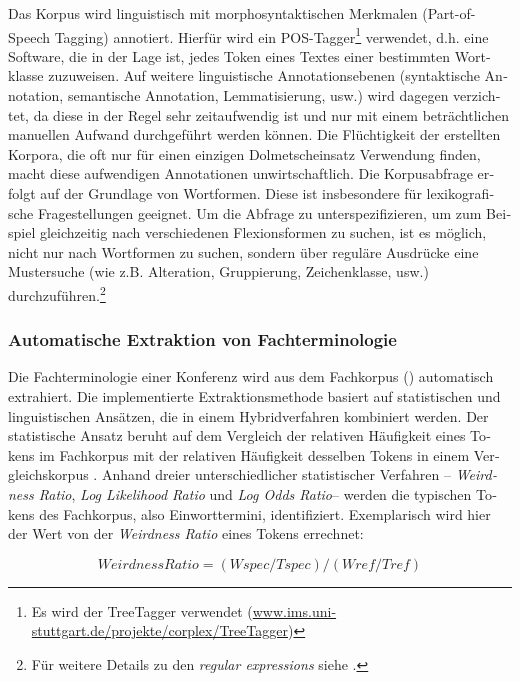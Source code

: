 \documentclass[output=paper]{LSP/langsci}
\begin{document}
\begin{otherlanguage}{ngerman}
Das Korpus wird linguistisch mit morphosyntaktischen Merkmalen (Part-of-Speech Tagging) annotiert.
Hierfür wird ein POS-Tagger\footnote{Es wird der TreeTagger verwendet (\url{www.ims.uni-stuttgart.de/projekte/corplex/TreeTagger})} verwendet, d.h. eine Software, die in der Lage ist, jedes Token eines Textes einer bestimmten Wortklasse zuzuweisen. Auf weitere linguistische Annotationsebenen (syntaktische Annotation, semantische Annotation, Lemmatisierung, usw.) wird dagegen verzichtet, da diese in der Regel sehr zeitaufwendig ist und nur mit einem beträchtlichen manuellen Aufwand durchgeführt werden können. Die Flüchtigkeit der erstellten Korpora, die oft nur für einen einzigen Dolmetscheinsatz Verwendung finden, macht diese aufwendigen Annotationen unwirtschaftlich. Die Korpusabfrage erfolgt auf der Grundlage von Wortformen. Diese ist insbesondere für lexikografische Fragestellungen geeignet. Um die Abfrage zu unterspezifizieren, um zum Beispiel gleichzeitig nach verschiedenen Flexionsformen zu suchen, ist es möglich, nicht nur nach Wortformen zu suchen, sondern über reguläre Ausdrücke eine Mustersuche (wie z.B. Alteration, Gruppierung, Zeichenklasse, usw.) durchzuführen.\footnote{Für weitere Details zu den \textit{regular expressions} siehe \citet{Friedl2006}.}

\subsubsection{Automatische Extraktion von Fachterminologie}\label{sec:fantinuoli:6.1.2}

Die Fachterminologie einer Konferenz wird aus dem Fachkorpus () automatisch extrahiert. Die implementierte Extraktionsmethode basiert auf statistischen und linguistischen Ansätzen, die in einem Hybridverfahren kombiniert werden. Der statistische Ansatz beruht auf dem Vergleich der relativen Häufigkeit eines Tokens im Fachkorpus mit der relativen Häufigkeit desselben Tokens in einem Vergleichskorpus \citep{Rayson2000}. Anhand dreier unterschiedlicher statistischer Verfahren -- \textit{Weirdness Ratio}, \textit{Log Likelihood Ratio} und \textit{Log Odds Ratio}-- werden die typischen Tokens des Fachkorpus, also Einworttermini, identifiziert. Exemplarisch wird hier der Wert von der \textit{Weirdness Ratio} eines Tokens errechnet:

$$
\mathit{Weirdness}\mathit{Ratio}=(\mathit{Wspec}/\mathit{Tspec})/(\mathit{Wref}/\mathit{Tref})
$$


\end{otherlanguage}
\end{document}
